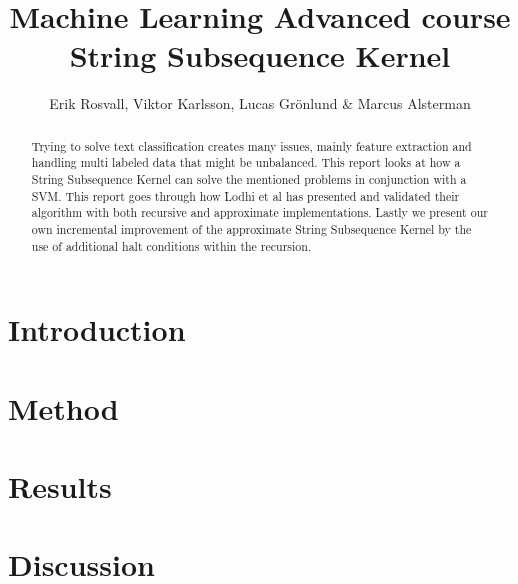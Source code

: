 \documentclass[10pt,a4paper]{article}
\author{Erik Rosvall, Viktor Karlsson, Lucas Grönlund \& Marcus Alsterman}
\title{Machine Learning Advanced course \\ String Subsequence Kernel}
\begin{document}
	\begin{titlingpage}
		\maketitle
		\begin{abstract}
			Trying to solve text classification creates many issues, mainly feature extraction and handling multi labeled data that might be unbalanced. This report looks at how a String Subsequence Kernel can solve the mentioned problems in conjunction with a SVM. This report goes through how Lodhi et al has presented and validated their algorithm with both recursive and approximate implementations. Lastly we present our own incremental improvement of the approximate String Subsequence Kernel by the use of additional halt conditions within the recursion. 
		\end{abstract}
	\end{titlingpage}
	
	\section{Introduction}
	
	
	\section{Method}
	

	\section{Results}
	
	
	\section{Discussion}
	
	
	
	
	
\end{document}
